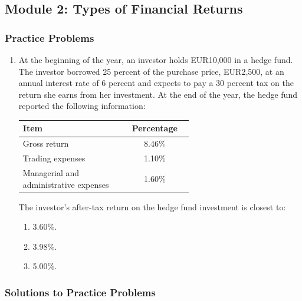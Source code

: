 \newpage

\subsection{Module 2: Types of Financial Returns}
\label{sec:app_Problems_M2}

\subsubsection{Practice Problems}
\label{subsec:app_Problems_M2}

\begin{enumerate}
	\item At the beginning of the year, an investor holds EUR10,000 in a hedge fund. The investor borrowed 25 percent of the purchase price, EUR2,500, at an annual interest rate of 6 percent and expects to pay a 30 percent tax on the return she earns from her investment. At the end of the year, the hedge fund reported the following information:
	      \begin{center}
	      \begin{tabular}{p{0.6\linewidth}  c}
		      \toprule
		      \textbf{Item} & \textbf{Percentage} \\
		      \midrule
		      Gross return & 8.46\% \\
		      Trading expenses & 1.10\% \\
		      Managerial and administrative expenses & 1.60\% \\
		      \bottomrule
	      \end{tabular}
	      \end{center}
	      The investor's after-tax return on the hedge fund investment is closest to:
	      \begin{enumerate}[label=\Alph*.]
		      \item 3.60\%.
		      \item 3.98\%.
		      \item 5.00\%.
	      \end{enumerate}
\end{enumerate}

\subsubsection{Solutions to Practice Problems}
\label{subsec:app_Solutions_M2}


